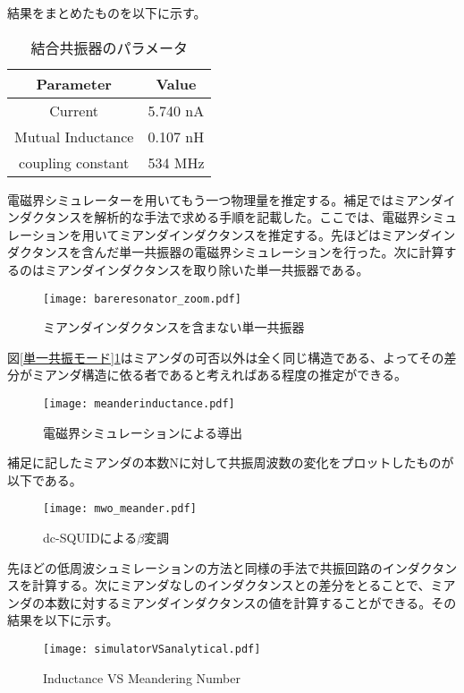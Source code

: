         結果をまとめたものを以下に示す。
        \begin{table}[H]
            \caption{結合共振器のパラメータ}
            \centering
            \begin{tabular}{@{}cc@{}}
            \toprule
            Parameter & Value    \\ 
            \hline \hline
            Current        & 5.740 nA \\
            Mutual Inductance       & 0.107 nH \\ 
            coupling constant         & 534 MHz  \\\bottomrule
            \end{tabular}
        \end{table}
        電磁界シミュレーターを用いてもう一つ物理量を推定する。補足ではミアンダインダクタンスを解析的な手法で求める手順を記載した。ここでは、電磁界シミュレーションを用いてミアンダインダクタンスを推定する。先ほどはミアンダインダクタンスを含んだ単一共振器の電磁界シミュレーションを行った。次に計算するのはミアンダインダクタンスを取り除いた単一共振器である。
        \begin{figure}[H]
            \centering
            \texttt{[image: bareresonator\_zoom.pdf]}
            \caption{ミアンダインダクタンスを含まない単一共振器}
            \label{ミアンダなし}
        \end{figure}
        図\ref*{単一共振モード}\ref*{ミアンダなし}はミアンダの可否以外は全く同じ構造である、よってその差分がミアンダ構造に依る者であると考えればある程度の推定ができる。
        \begin{figure}[H]
            \centering
            \texttt{[image: meanderinductance.pdf]}
            \caption{電磁界シミュレーションによる導出}
        \end{figure}
        補足に記したミアンダの本数Nに対して共振周波数の変化をプロットしたものが以下である。
        \begin{figure}[H]
            \centering
            \texttt{[image: mwo\_meander.pdf]}
            \caption{dc-SQUIDによる$\beta$変調}
        \end{figure}
        先ほどの低周波シュミレーションの方法と同様の手法で共振回路のインダクタンスを計算する。次にミアンダなしのインダクタンスとの差分をとることで、ミアンダの本数に対するミアンダインダクタンスの値を計算することができる。その結果を以下に示す。
        \begin{figure}[H]
            \centering
            \texttt{[image: simulatorVSanalytical.pdf]}
            \caption{Inductance VS Meandering Number}
        \end{figure}

